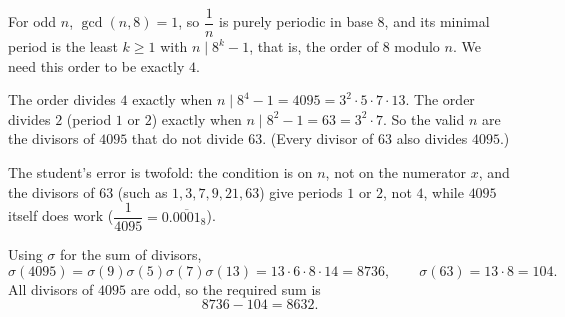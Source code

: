 For odd \(n\), \(\gcd(n,8)=1\), so \(\dfrac{1}{n}\) is purely periodic in base \(8\), and its minimal period is the least \(k\ge 1\) with \(n\mid 8^k-1\), that is, the order of \(8\) modulo \(n\). We need this order to be exactly \(4\).

The order divides \(4\) exactly when \(n\mid 8^4-1=4095=3^2\cdot 5\cdot 7\cdot 13\). The order divides \(2\) (period \(1\) or \(2\)) exactly when \(n\mid 8^2-1=63=3^2\cdot 7\). So the valid \(n\) are the divisors of \(4095\) that do not divide \(63\). (Every divisor of \(63\) also divides \(4095\).)

The student's error is twofold: the condition is on \(n\), not on the numerator \(x\), and the divisors of \(63\) (such as \(1,3,7,9,21,63\)) give periods \(1\) or \(2\), not \(4\), while \(4095\) itself does work (\(\dfrac{1}{4095}=0.\overline{0001}_8\)).

Using \(\sigma\) for the sum of divisors,
\[
\sigma(4095)=\sigma(9)\sigma(5)\sigma(7)\sigma(13)=13\cdot 6\cdot 8\cdot 14=8736,\qquad \sigma(63)=13\cdot 8=104.
\]
All divisors of \(4095\) are odd, so the required sum is
\[
8736-104=\boxed{8632}.
\]
